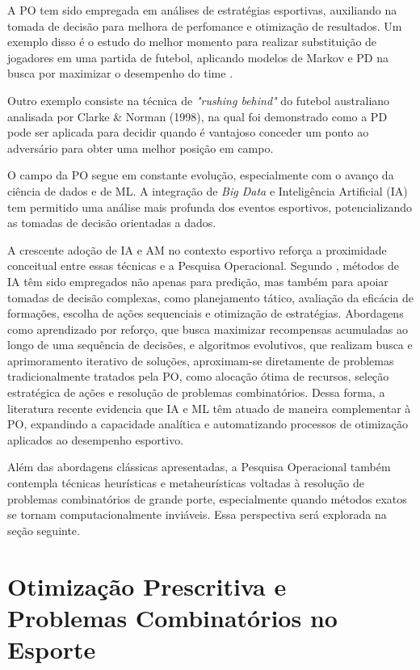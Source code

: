 A PO tem sido empregada em análises de estratégias esportivas, auxiliando na tomada de decisão para melhora de perfomance e otimização de resultados. 
Um exemplo disso é o estudo do melhor momento para realizar substituição de jogadores em uma partida de futebol, 
aplicando modelos de Markov e PD na busca por maximizar o desempenho do time \cite{Hirotsu2002}.

Outro exemplo consiste na técnica de \textit{"rushing behind"} do futebol australiano analisada por Clarke \& Norman (1998), 
na qual foi demonstrado como a PD pode ser aplicada para decidir quando é vantajoso conceder um ponto ao adversário para obter uma melhor posição em campo.

O campo da PO segue em constante evolução, especialmente com o avanço da ciência de dados e de ML. A integração de \textit{Big Data} e 
Inteligência Artificial (IA) tem permitido uma análise mais profunda dos eventos esportivos, potencializando as tomadas de decisão orientadas a dados.

A crescente adoção de IA e AM no contexto esportivo reforça a proximidade conceitual entre essas técnicas e a Pesquisa Operacional. 
Segundo \cite{Chmait2021}, métodos de IA têm sido empregados não apenas para predição, mas também para apoiar tomadas de decisão complexas, como planejamento tático, 
avaliação da eficácia de formações, escolha de ações sequenciais e otimização de estratégias. Abordagens como aprendizado por reforço, que busca maximizar recompensas 
acumuladas ao longo de uma sequência de decisões, e algoritmos evolutivos, que realizam busca e aprimoramento iterativo de soluções, aproximam-se diretamente de problemas 
tradicionalmente tratados pela PO, como alocação ótima de recursos, seleção estratégica de ações e resolução de problemas combinatórios. Dessa forma, a literatura recente 
evidencia que IA e ML têm atuado de maneira complementar à PO, expandindo a capacidade analítica e automatizando processos de otimização aplicados ao desempenho esportivo.

Além das abordagens clássicas apresentadas, a Pesquisa Operacional também contempla técnicas heurísticas e metaheurísticas voltadas à resolução de problemas combinatórios 
de grande porte, especialmente quando métodos exatos se tornam computacionalmente inviáveis. Essa perspectiva será explorada na seção seguinte.

\section{Otimização Prescritiva e Problemas Combinatórios no Esporte}

